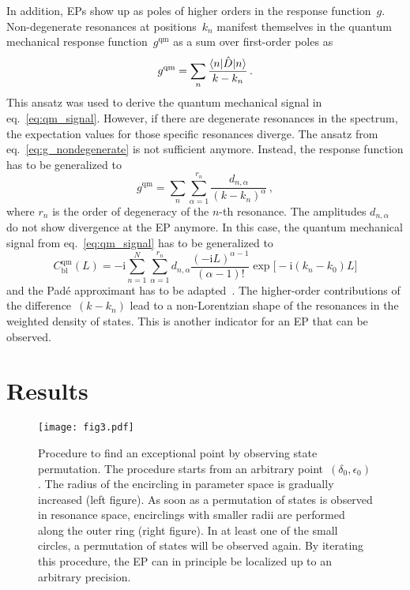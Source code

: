 \documentclass[doublecol]{epl2}
\newcommand{\ii}{\mathrm{i}}
\begin{document}
In addition, EPs show up as poles of higher orders in the response function~$g$.
Non-degenerate resonances at positions~$k_n$ manifest themselves in the quantum mechanical response function~$g^\mathrm{qm}$ as a sum over first-order poles as
\begin{equation}
  g^\mathrm{qm} = \sum_n \frac{\braket{n|\hat{D}|n}}{k-k_n}\,.
  \label{eq:g_nondegenerate}
\end{equation}
This ansatz was used to derive the quantum mechanical signal in eq.~\eqref{eq:qm_signal}. However, if there are degenerate resonances in the spectrum, the expectation values for those specific resonances diverge. The ansatz from eq.~\eqref{eq:g_nondegenerate} is not sufficient anymore. Instead, the response function has to be generalized to
\begin{equation}
  g^\mathrm{qm} = \sum_n \sum_{\alpha = 1}^{r_n} \frac{d_{n, \alpha}}{(k - k_n)^\alpha}\,,
  \label{eq:g_degenerate}
\end{equation}
where $r_n$ is the order of degeneracy of the $n$-th resonance. The amplitudes $d_{n, \alpha}$ do not show divergence at the EP anymore. In this case, the quantum mechanical signal from eq.~\eqref{eq:qm_signal} has to be generalized to
\begin{equation}
  C^\mathrm{qm}_\mathrm{bl}(L) = -\ii \sum_{n=1}^N \sum_{\alpha = 1}^{r_n} d_{n, \alpha} \frac{(-\ii L)^{\alpha - 1}}{(\alpha - 1)!} \exp\bigl[-\ii (k_n - k_0) L\bigr]
\end{equation}
and the Padé approximant has to be adapted~\cite{fuchs_harmonic_2014}. The higher-order contributions of the difference~$(k-k_n)$ lead to a non-Lorentzian shape of the resonances in the weighted density of states. This is another indicator for an EP that can be observed.

\section{Results}
\begin{figure}[t]
  \centering
  \texttt{[image: fig3.pdf]}
  \caption{Procedure to find an exceptional point by observing state permutation. The procedure starts from an arbitrary point~$(\delta_0, \epsilon_0)$. The radius of the encircling in parameter space is gradually increased (left figure). As soon as a permutation of states is observed in resonance space, encirclings with smaller radii are performed along the outer ring (right figure). In at least one of the small circles, a permutation of states will be observed again. By iterating this procedure, the EP can in principle be localized up to an arbitrary precision.}
  \label{fig:ep_radius_increase}
\end{figure}
\end{document}
